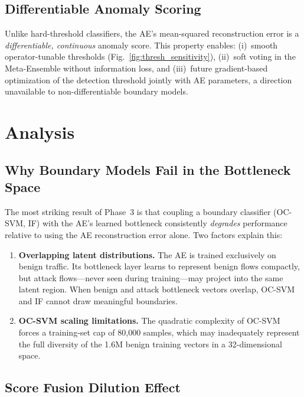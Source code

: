 \documentclass[10pt,conference]{IEEEtran}
\begin{document}
\subsection{Differentiable Anomaly Scoring}

Unlike hard-threshold classifiers, the AE's mean-squared reconstruction
error is a \emph{differentiable, continuous} anomaly score.  This
property enables:
(i)~smooth operator-tunable thresholds (Fig.~\ref{fig:thresh_sensitivity}),
(ii)~soft voting in the Meta-Ensemble without information loss, and
(iii)~future gradient-based optimization of the detection threshold
jointly with AE parameters, a direction unavailable to non-differentiable
boundary models.

\section{Analysis}
\label{sec:analysis}

\subsection{Why Boundary Models Fail in the Bottleneck Space}

The most striking result of Phase~3 is that coupling a boundary
classifier (OC-SVM, IF) with the AE's learned bottleneck consistently
\emph{degrades} performance relative to using the AE reconstruction
error alone.  Two factors explain this:

\begin{enumerate}[leftmargin=*,noitemsep]
  \item \textbf{Overlapping latent distributions.}  The AE is trained
        exclusively on benign traffic.  Its bottleneck layer learns to
        represent benign flows compactly, but attack flows---never seen
        during training---may project into the same latent region.
        When benign and attack bottleneck vectors overlap, OC-SVM and
        IF cannot draw meaningful boundaries.
  \item \textbf{OC-SVM scaling limitations.}  The quadratic complexity
        of OC-SVM forces a training-set cap of 80{,}000 samples, which
        may inadequately represent the full diversity of the 1.6M benign
        training vectors in a 32-dimensional space.
\end{enumerate}

\subsection{Score Fusion Dilution Effect}
\end{document}

